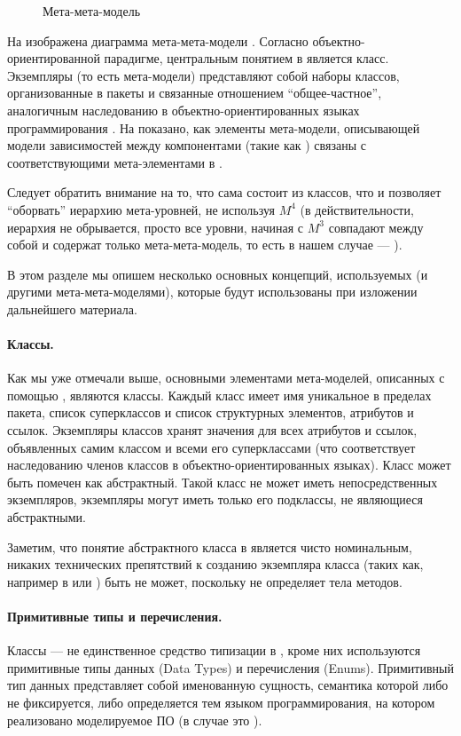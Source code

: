 \begin{figure}[htbp]
\caption{Мета-мета-модель }\label{Ecore}
\end{figure}

На  изображена диаграмма мета-мета-модели . Согласно объектно-ориентированной парадигме, центральным понятием в  является класс. Экземпляры  (то есть мета-модели) представляют собой наборы классов, организованные в пакеты и связанные отношением ``общее-частное'', аналогичным наследованию в объектно-ориентированных языках программирования \cite{OOP}. На  показано, как элементы мета-модели, описывающей модели зависимостей между компонентами (такие как ) связаны с соответствующими мета-элементами в .

Следует обратить внимание на то, что  сама состоит из классов, что и позволяет ``оборвать'' иерархию мета-уровней, не используя $M^4$ (в действительности, иерархия не обрывается, просто все уровни, начиная с $M^3$ совпадают между собой и содержат только мета-мета-модель, то есть в нашем случае --- ).

В этом разделе мы опишем несколько основных концепций, используемых  (и другими мета-мета-моделями), которые будут использованы при изложении дальнейшего материала.

\paragraph*{Классы.} Как мы уже отмечали выше, основными элементами мета-моделей, описанных с помощью , являются классы. Каждый класс имеет имя уникальное в пределах пакета, список суперклассов и список структурных элементов, атрибутов и ссылок. Экземпляры классов хранят значения для всех атрибутов и ссылок, объявленных самим классом и всеми его суперклассами (что соответствует наследованию членов классов в объектно-ориентированных языках). Класс может быть помечен как абстрактный. Такой класс не может иметь непосредственных экземпляров, экземпляры могут иметь только его подклассы, не являющиеся абстрактными.

Заметим, что понятие абстрактного класса в  является чисто номинальным, никаких технических препятствий к созданию экземпляра класса (таких как, например в  или ) быть не может, поскольку  не определяет тела методов. 

\paragraph*{Примитивные типы и перечисления.} Классы --- не единственное средство типизации в , кроме них используются примитивные типы данных (Data Types) и перечисления (Enums). Примитивный тип данных представляет собой именованную сущность, семантика которой либо не фиксируется, либо определяется тем языком программирования, на котором реализовано моделируемое ПО (в случае  это ). 

